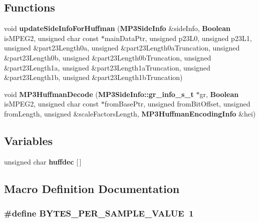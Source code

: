 \subsection*{Functions}
\begin{DoxyCompactItemize}
\item 
void {\bf update\+Side\+Info\+For\+Huffman} ({\bf M\+P3\+Side\+Info} \&side\+Info, {\bf Boolean} is\+M\+P\+E\+G2, unsigned char const $\ast$main\+Data\+Ptr, unsigned p23\+L0, unsigned p23\+L1, unsigned \&part23\+Length0a, unsigned \&part23\+Length0a\+Truncation, unsigned \&part23\+Length0b, unsigned \&part23\+Length0b\+Truncation, unsigned \&part23\+Length1a, unsigned \&part23\+Length1a\+Truncation, unsigned \&part23\+Length1b, unsigned \&part23\+Length1b\+Truncation)
\item 
void {\bf M\+P3\+Huffman\+Decode} ({\bf M\+P3\+Side\+Info\+::gr\+\_\+info\+\_\+s\+\_\+t} $\ast$gr, {\bf Boolean} is\+M\+P\+E\+G2, unsigned char const $\ast$from\+Base\+Ptr, unsigned from\+Bit\+Offset, unsigned from\+Length, unsigned \&scale\+Factors\+Length, {\bf M\+P3\+Huffman\+Encoding\+Info} \&hei)
\end{DoxyCompactItemize}
\subsection*{Variables}
\begin{DoxyCompactItemize}
\item 
unsigned char {\bf huffdec} [$\,$]
\end{DoxyCompactItemize}


\subsection{Macro Definition Documentation}
\subsubsection[{B\+Y\+T\+E\+S\+\_\+\+P\+E\+R\+\_\+\+S\+A\+M\+P\+L\+E\+\_\+\+V\+A\+L\+U\+E}]{\setlength{\rightskip}{0pt plus 5cm}\#define B\+Y\+T\+E\+S\+\_\+\+P\+E\+R\+\_\+\+S\+A\+M\+P\+L\+E\+\_\+\+V\+A\+L\+U\+E~1}\label{MP3InternalsHuffman_8hh_af40762483b32db29f215ef1a7f22071c}


